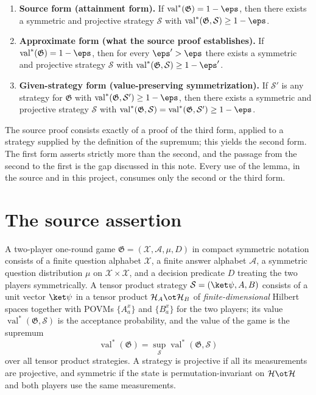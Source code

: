 \documentclass[11pt]{article}
\newcommand{\val}{\operatorname{val}}
\newcommand{\game}{\mathfrak{G}}
\newcommand{\strategy}{\mathcal{S}}
\begin{document}
\begin{enumerate}
  \item \textbf{Source form (attainment form).}  If
  $\val^*(\game) = 1-\eps$, then there exists a symmetric and projective
  strategy $\strategy$ with $\val^*(\game, \strategy) \ge 1-\eps$.
  \item \textbf{Approximate form (what the source proof establishes).}  If
  $\val^*(\game) = 1-\eps$, then for every $\eps' > \eps$ there exists a
  symmetric and projective strategy $\strategy$ with
  $\val^*(\game, \strategy) \ge 1-\eps'$.
  \item \textbf{Given-strategy form (value-preserving symmetrization).}  If
  $\strategy'$ is any strategy for $\game$ with
  $\val^*(\game, \strategy') \ge 1-\eps$, then there exists a symmetric and
  projective strategy $\strategy$ with
  $\val^*(\game, \strategy) = \val^*(\game, \strategy') \ge 1-\eps$.
\end{enumerate}

The source proof consists exactly of a proof of the third form, applied to a
strategy supplied by the definition of the supremum; this yields the second
form.  The first form asserts strictly more than the second, and the passage
from the second to the first is the gap discussed in this note.  Every use of
the lemma, in the source and in this project, consumes only the second or the
third form.

\section{The source assertion}

A two-player one-round game
$\game = (\mathcal X, \mathcal A, \mu, D)$ in compact symmetric notation
consists of a finite question alphabet $\mathcal X$, a finite answer alphabet
$\mathcal A$, a symmetric question distribution $\mu$ on
$\mathcal X \times \mathcal X$, and a decision predicate $D$ treating the two
players symmetrically.  A tensor product strategy
$\strategy = (\ket\psi, A, B)$ consists of a unit vector $\ket\psi$ in a
tensor product $\mathcal H_A \ot \mathcal H_B$ of \emph{finite-dimensional}
Hilbert spaces together with POVMs $\{A^x_a\}$ and $\{B^x_a\}$ for the two
players; its value $\val^*(\game, \strategy)$ is the acceptance probability,
and the value of the game is the supremum
\begin{equation*}
  \val^*(\game) = \sup_{\strategy} \val^*(\game, \strategy)
\end{equation*}
over all tensor product strategies.  A strategy is projective if all its
measurements are projective, and symmetric if the state is
permutation-invariant on $\mathcal H \ot \mathcal H$ and both players use the
same measurements.
\end{document}
